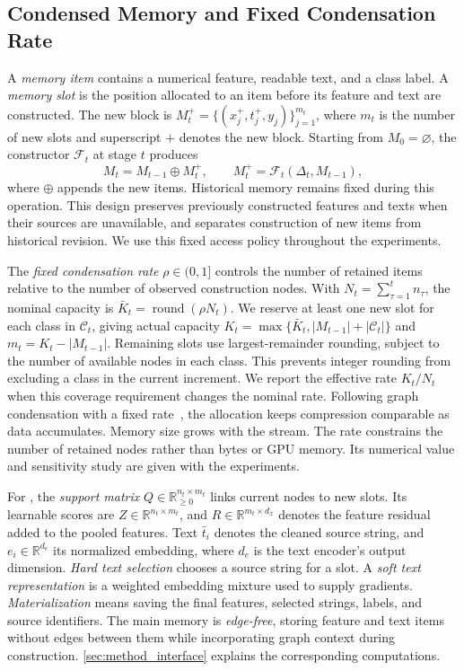 \subsection{Condensed Memory and Fixed Condensation Rate}
\label{sec:memory_setting}

A \emph{memory item} contains a numerical feature, readable text, and a
class label. A \emph{memory slot} is the position allocated to an item
before its feature and text are constructed. The new block is
$M_t^+=\{(x_j^+,t_j^+,y_j)\}_{j=1}^{m_t}$, where $m_t$ is the number of
new slots and superscript $+$ denotes the new block. Starting from
$M_0=\varnothing$, the constructor $\mathcal F_t$ at stage $t$ produces
\begin{equation}
 M_t=M_{t-1}\oplus M_t^+,
 \qquad M_t^+=\mathcal F_t(\Delta_t,M_{t-1}),
\label{eq:continual_memory}
\end{equation}
where $\oplus$ appends the new items. Historical memory remains fixed
during this operation. This design preserves previously constructed features
and texts when their sources are unavailable, and separates construction of
new items from historical revision. We use this fixed access policy
throughout the experiments.

The \emph{fixed condensation rate} $\rho\in(0,1]$ controls the number of retained
items relative to the number of observed construction nodes. With
$N_t=\sum_{\tau=1}^{t}n_\tau$, the nominal capacity is
$\bar K_t=\operatorname{round}(\rho N_t)$. We reserve at least one new
slot for each class in $\mathcal C_t$, giving actual capacity
$K_t=\max\{\bar K_t,|M_{t-1}|+|\mathcal C_t|\}$ and
$m_t=K_t-|M_{t-1}|$. Remaining slots use largest-remainder rounding,
subject to the number of available nodes in each class. This prevents
integer rounding from excluding a class in the current increment. We report the
effective rate $K_t/N_t$ when this coverage requirement changes the nominal
rate. Following graph condensation with a fixed rate~\cite{cat}, the allocation
keeps compression comparable as data accumulates. Memory
size grows with the stream. The rate constrains the number of retained
nodes rather than bytes or GPU memory. Its numerical value and
sensitivity study are given with the experiments.

For \method{}, the \emph{support matrix}
$Q\in\mathbb R_{\geq0}^{n_t\times m_t}$ links current nodes to new slots.
Its learnable scores are $Z\in\mathbb R^{n_t\times m_t}$, and
$R\in\mathbb R^{m_t\times d_x}$ denotes the feature residual added to
the pooled features. Text $\bar t_i$ denotes the cleaned source string,
and $e_i\in\mathbb R^{d_e}$ its normalized embedding, where $d_e$ is the
text encoder's output dimension. \emph{Hard text selection} chooses a
source string for a slot. A \emph{soft text representation} is a weighted embedding mixture
used to supply gradients. \emph{Materialization} means saving the final
features, selected strings, labels, and source identifiers. The main
memory is \emph{edge-free}, storing feature and text items without edges
between them while incorporating graph context during construction.
\autoref{sec:method_interface} explains the
corresponding computations.

